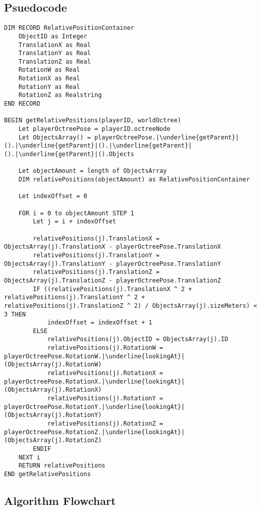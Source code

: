 \documentclass[12pt, DIV=calc]{scrartcl}
\begin{document}
\subsection{Psuedocode}
\begin{verbatim}
DIM RECORD RelativePositionContainer
    ObjectID as Integer
    TranslationX as Real
    TranslationY as Real
    TranslationZ as Real
    RotationW as Real
    RotationX as Real
    RotationY as Real
    RotationZ as Realstring
END RECORD

BEGIN getRelativePositions(playerID, worldOctree)
    Let playerOctreePose = playerID.octreeNode
    Let ObjectsArray() = playerOctreePose.|\underline{getParent}|().|\underline{getParent}|().|\underline{getParent}|().|\underline{getParent}|().Objects

    Let objectAmount = length of ObjectsArray
    DIM relativePositions(objectAmount) as RelativePositionContainer

    Let indexOffset = 0

    FOR i = 0 to objectAmount STEP 1
        Let j = i + indexOffset

        relativePositions(j).TranslationX = ObjectsArray(j).TranslationX - playerOctreePose.TranslationX
        relativePositions(j).TranslationY = ObjectsArray(j).TranslationY - playerOctreePose.TranslationY
        relativePositions(j).TranslationZ = ObjectsArray(j).TranslationZ - playerOctreePose.TranslationZ
        IF ((relativePositions(j).TranslationX ^ 2 + relativePositions(j).TranslationY ^ 2 + relativePositions(j).TranslationZ ^ 2) / ObjectsArray(j).sizeMeters) < 3 THEN
            indexOffset = indexOffset + 1
        ELSE
            relativePositions(j).ObjectID = ObjectsArray(j).ID
            relativePositions(j).RotationW = playerOctreePose.RotationW.|\underline{lookingAt}|(ObjectsArray(j).RotationW)   
            relativePositions(j).RotationX = playerOctreePose.RotationX.|\underline{lookingAt}|(ObjectsArray(j).RotationX) 
            relativePositions(j).RotationY = playerOctreePose.RotationY.|\underline{lookingAt}|(ObjectsArray(j).RotationY) 
            relativePositions(j).RotationZ = playerOctreePose.RotationZ.|\underline{lookingAt}|(ObjectsArray(j).RotationZ) 
        ENDIF        
    NEXT i
    RETURN relativePositions
END getRelativePositions
\end{verbatim}

\subsection{Algorithm Flowchart}
\end{document}
